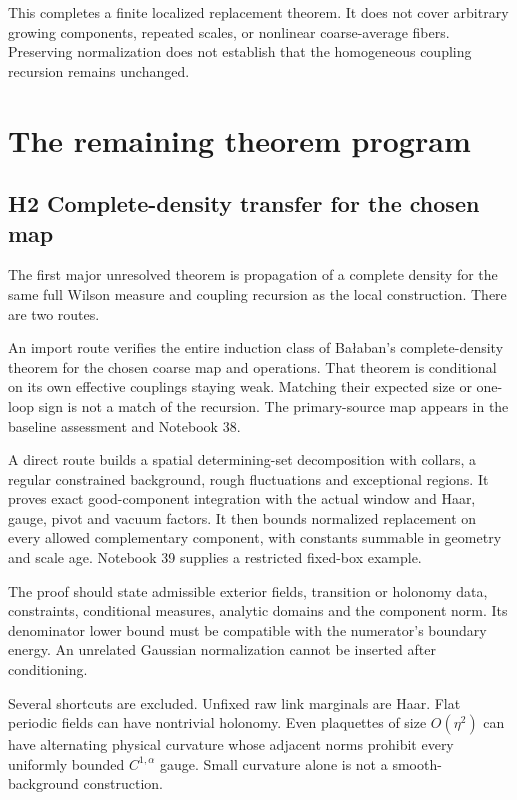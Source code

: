 This completes a finite localized replacement theorem.
It does not cover arbitrary growing components,
repeated scales, or nonlinear coarse-average fibers.
Preserving normalization does not establish that the
homogeneous coupling recursion remains unchanged.

\section{The remaining theorem program}
\label{hdc-open}

\subsection{H2 Complete-density transfer for the chosen map}

The first major unresolved theorem is propagation of
a complete density for the same full Wilson measure
and coupling recursion as the local construction.
There are two routes.

An import route verifies the entire induction class
of Ba{\l}aban's complete-density theorem for the chosen
coarse map and operations. That theorem is conditional
on its own effective couplings staying weak.
Matching their expected size or one-loop sign is not
a match of the recursion. The primary-source map
appears in the baseline assessment and Notebook 38.

A direct route builds a spatial determining-set
decomposition with collars, a regular constrained
background, rough fluctuations and exceptional
regions. It proves exact good-component integration
with the actual window and Haar, gauge, pivot and
vacuum factors. It then bounds normalized replacement
on every allowed complementary component, with
constants summable in geometry and scale age.
Notebook 39 supplies a restricted fixed-box example.

The proof should state admissible exterior fields,
transition or holonomy data, constraints, conditional
measures, analytic domains and the component norm.
Its denominator lower bound must be compatible with
the numerator's boundary energy. An unrelated
Gaussian normalization cannot be inserted after
conditioning.

Several shortcuts are excluded. Unfixed raw link
marginals are Haar. Flat periodic fields can have
nontrivial holonomy. Even plaquettes of size
\(O(\eta^2)\) can have alternating physical curvature
whose adjacent norms prohibit every uniformly
bounded \(C^{1,\alpha}\) gauge. Small curvature
alone is not a smooth-background construction.

